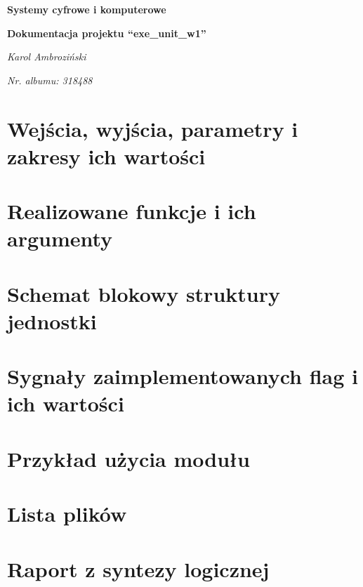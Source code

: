 \documentclass[12pt]{article}
\title{}
\author{}
\date{}
\begin{document}
	\begin{titlepage}
		\centering
		\vspace{1cm}
		{\huge\bfseries Systemy cyfrowe i komputerowe\par}
		\vspace{0.5cm}
		{\huge\bfseries Dokumentacja projektu ``exe\_unit\_w1''\par}
		\vspace{2cm}
		{\Large\itshape Karol Ambroziński\par}
		\vspace{0cm}
		{\Large\itshape Nr. albumu: 318488\par}
		\vfill
	\end{titlepage}

	\tableofcontents
	
	\newpage
	
	\section{Wejścia, wyjścia, parametry i zakresy ich wartości}
	
	
	
	\section{Realizowane funkcje i ich argumenty}

	
	
	\section{Schemat blokowy struktury jednostki}
	
	
	
	\section{Sygnały zaimplementowanych flag i ich wartości}
	
	

	\newpage

	\section{Przykład użycia modułu}
	
	\section{Lista plików}
	
	\newpage
	\section{Raport z syntezy logicznej}
	
\end{document}
